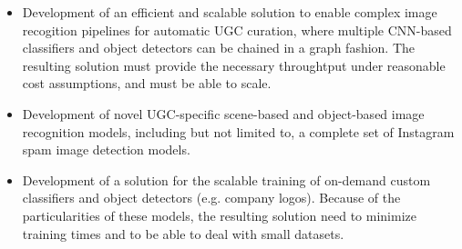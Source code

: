 \begin{itemize} 
\item
Development of an efficient and scalable solution to enable complex image recogition pipelines for automatic UGC curation, where multiple CNN-based classifiers and object detectors can be chained in a graph fashion. The resulting solution must provide the necessary throughtput under reasonable cost assumptions, and must be able to scale. 
\item
Development of novel UGC-specific scene-based and object-based image recognition models, including but not limited to, a complete set of Instagram spam image detection models. 
\item
Development of a solution for the scalable training of on-demand custom classifiers and object detectors (e.g. company logos). Because of the particularities of these models, the resulting solution need to minimize training times and to be able to deal with small datasets. 
\end{itemize} 



